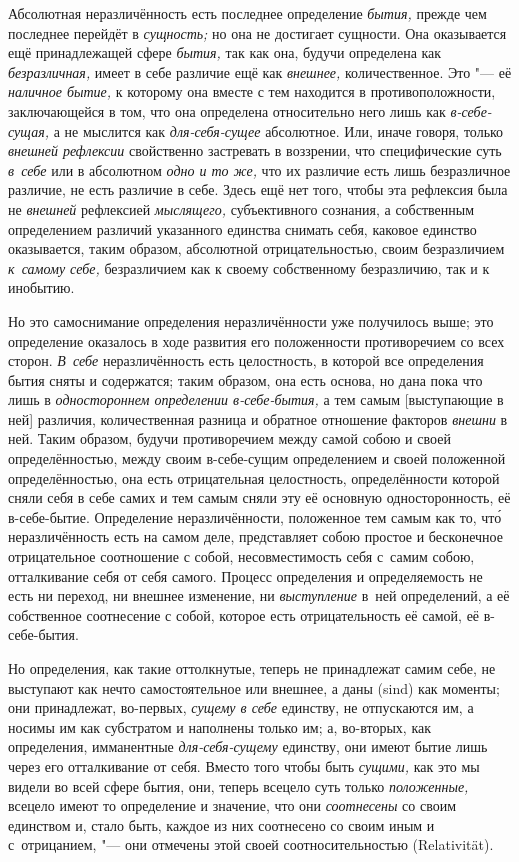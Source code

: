 
Абсолютная неразличённость есть последнее определение {\em бытия,} прежде чем
последнее перейдёт в {\em сущность;} но она не достигает сущности. Она
оказывается ещё принадлежащей сфере {\em бытия,} так как она, будучи определена
как {\em безразличная,} имеет в себе различие ещё как {\em внешнее,}
количественное. Это "--- её {\em наличное бытие,} к которому она вместе с тем
находится в противоположности, заключающейся в том, что она определена
относительно него лишь как {\em в-себе-сущая,} а не мыслится как
{\em для-себя-сущее} абсолютное. Или, иначе говоря, только
{\em внешней рефлексии} свойственно застревать в воззрении, что специфические
суть {\em в~себе} или в абсолютном {\em одно и то же,} что их различие есть
лишь безразличное различие, не есть различие в себе. Здесь ещё нет того, чтобы
эта рефлексия была не {\em внешней} рефлексией {\em мыслящего,} субъективного
сознания, а собственным определением различий указанного единства снимать себя,
каковое единство оказывается, таким образом, абсолютной отрицательностью, своим
безразличием {\em к~самому себе,} безразличием как к своему собственному
безразличию, так и к инобытию.

Но это самоснимание определения неразличённости уже получилось выше; это
определение оказалось в ходе развития его положенности противоречием со всех
сторон. {\em В~себе} неразличённость есть целостность, в которой все
определения бытия сняты и содержатся; таким образом, она есть основа, но дана
пока что лишь в {\em одностороннем определении в-себе-бытия,} а тем самым
[выступающие в ней] различия, количественная разница и обратное отношение
факторов {\em внешни} в ней. Таким образом, будучи противоречием между самой
собою и своей определённостью, между своим в-себе-сущим определением и своей
положенной определённостью, она есть отрицательная целостность, определённости
которой сняли себя в себе самих и тем самым сняли эту её основную
односторонность, её в-себе-бытие. Определение неразличённости, положенное тем
самым как то, чт\'{о} неразличённость есть на самом деле, представляет собою
простое и бесконечное отрицательное соотношение с собой, несовместимость себя
с~самим собою, отталкивание себя от себя самого. Процесс определения и
определяемость не есть ни переход, ни внешнее изменение, ни {\em выступление}
в~ней определений, а её собственное соотнесение с собой, которое есть
отрицательность её самой, её в-себе-бытия.

Но определения, как такие оттолкнутые, теперь не принадлежат самим себе, не
выступают как нечто самостоятельное или внешнее, а даны (sind) как моменты; они
принадлежат, во-первых, {\em сущему в себе} единству, не отпускаются им, а
носимы им как субстратом и наполнены только им; а, во-вторых, как определения,
имманентные {\em для-себя-сущему} единству, они имеют бытие лишь через его
отталкивание от себя. Вместо того чтобы быть {\em сущими,} как это мы видели во
всей сфере бытия, они, теперь всецело суть только {\em положенные,} всецело
имеют то определение и значение, что они {\em соотнесены} со своим единством и,
стало быть, каждое из них соотнесено со своим иным и с~отрицанием, "--- они
отмечены этой своей соотносительностью (Rela\-tivi\-tät).


